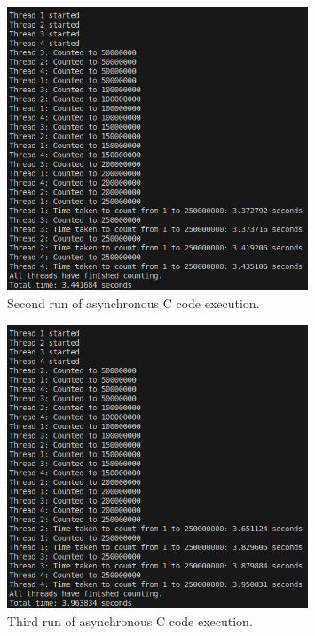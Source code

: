 \documentclass[12pt,a4paper]{article}
\begin{document}
\begin{figure}[htbp]
    \centering
    \includegraphics[width=0.8\textwidth]{../async_records/results_c/result_2.png}
    \caption{Second run of asynchronous C code execution.}
    \label{fig:C-async-runtime-2}
\end{figure}

\begin{figure}[htbp]
    \centering
    \includegraphics[width=0.8\textwidth]{../async_records/results_c/result_3.png}
    \caption{Third run of asynchronous C code execution.}
    \label{fig:C-async-runtime-3}
\end{figure}
\end{document}
